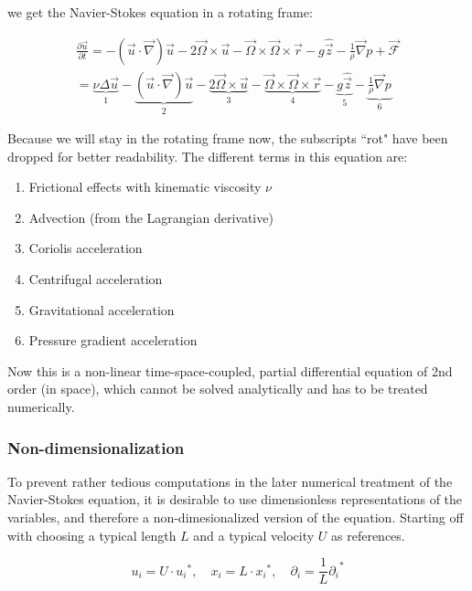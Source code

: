 \documentclass[12pt, a4paper]{article} %
\begin{document}
			we get the Navier-Stokes equation in a rotating frame:
			
			\begin{eqnarray}
				\frac{\partial\vec{u}}{\partial t}
				= - \left(\vec{u}\cdot\vec{\nabla}\right)\vec{u} - 2\vec{\Omega}\times\vec{u} - \vec{\Omega}\times\vec{\Omega}\times\vec{r} - g\hat{\vec{z}} - \frac{1}{\rho}\vec{\nabla}p + \vec{\mathcal{F}}
				\nonumber \\
				= \underbrace{\nu\Delta\vec{u}}_{1} - \underbrace{\left(\vec{u}\cdot\vec{\nabla}\right)\vec{u}}_{2} - \underbrace{2\vec{\Omega}\times\vec{u}}_{3}- \underbrace{\vec{\Omega}\times\vec{\Omega}\times\vec{r}}_{4} - \underbrace{g\hat{\vec{z}}}_{5} - \underbrace{\frac{1}{\rho}\vec{\nabla}p}_{6}
				\label{eq: NSG}
			\end{eqnarray}
			
			Because we will stay in the rotating frame now, the subscripts ``rot" have been dropped for better readability. The different terms in this equation are:
			
				\begin{enumerate}
					\item Frictional effects with kinematic viscosity $\nu$
					\item Advection (from the Lagrangian derivative)
					\item Coriolis acceleration
					\item Centrifugal acceleration
					\item Gravitational acceleration
					\item Pressure gradient acceleration
				\end{enumerate}
			
			Now this is a non-linear time-space-coupled, partial differential equation of 2nd order (in space), which cannot be solved analytically and has to be treated numerically.
			
		\subsubsection{Non-dimensionalization}
			
		To prevent rather tedious computations in the later numerical treatment of the Navier-Stokes equation, it is desirable to use dimensionless representations of the variables, and therefore a non-dimesionalized version of the equation. Starting off with choosing a typical length $L$ and a typical velocity $U$ as references.
			
			\begin{equation}
			u_i = U \cdot {u_i}^*, \quad x_i = L \cdot {x_i}^*, \quad \partial_i = \frac{1}{L}{\partial_i}^*
			\nonumber
			\end{equation}
			
\end{document}
